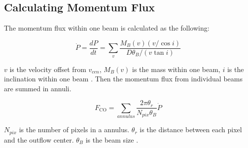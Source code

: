 \subsection{Calculating Momentum Flux}

The momentum flux within one beam is calculated as the following:

\begin{equation}
\dot{P} = \frac{dP}{dt} = \sum_{v} {\frac{M_B (v) (v/ \cos i)}{D\theta_B / (v \tan i)}}
\end{equation}

$v$ is the velocity offset from $v_{cen}$, $M_B (v)$ is the mass within one beam, $i$ is the inclination within one beam \cite{hatchell2007star}.
Then the momentum flux from individual beams are summed in annuli. 

\begin{equation}
F_{\textrm{CO}} = \sum _{annulus} \frac{2\pi \theta_r}{N_{pix}\theta_B}\dot{P}	
\end{equation}

$N_{pix}$ is the number of pixels in a annulus. $\theta_r$ is the distance between each pixel and the outflow center. $\theta_B$ is the beam size \cite{hatchell2007star, van2013outflow}.
